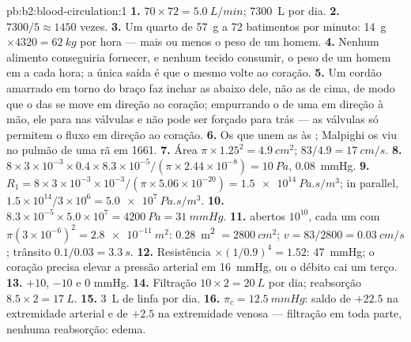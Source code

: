 \begin{solution}{pb:b2:blood-circulation:1}
\textbf{1.} $70\times 72 = \qty{5.0}{L/min}$; \qty{7300}{L} por dia.
\textbf{2.} $7300/5 \approx 1450$ vezes.
\textbf{3.} Um quarto de \qty{57}{g} a 72 batimentos por minuto:
\qty{14}{g} $\times 4320 = \qty{62}{kg}$ por hora --- mais ou menos o
peso de um homem.
\textbf{4.} Nenhum alimento conseguiria fornecer, e nenhum tecido
consumir, o peso de um homem em  a cada hora; a única saída é que
o mesmo  volte ao coração.
\textbf{5.} Um cordão amarrado em torno do braço faz inchar as 
abaixo dele, não as de cima, de modo que o  das  se move em
direção ao coração; empurrando o  de uma  em direção à mão,
ele para nas válvulas e não pode ser forçado para trás --- as válvulas
só permitem o fluxo em direção ao coração.
\textbf{6.} Os  que unem as  às ; Malpighi os viu
no pulmão de uma rã em 1661.
\textbf{7.} Área $\pi\times 1.25^{2} = \qty{4.9}{cm^2}$; $83/4.9 =
\qty{17}{cm/s}$.
\textbf{8.} $8\times 3\times 10^{-3}\times 0.4\times 8.3\times
10^{-5}/(\pi\times 2.44\times 10^{-8}) = \qty{10}{Pa}$, \qty{0.08}{mmHg}.
\textbf{9.} $R_{1} = 8\times 3\times 10^{-3}\times 10^{-3}/(\pi\times
5.06\times 10^{-20}) = \qty{1.5e14}{Pa.s/m^3}$; in parallel,
$1.5\times 10^{14}/3\times 10^{6} = \qty{5.0e7}{Pa.s/m^3}$.
\textbf{10.} $8.3\times 10^{-5}\times 5.0\times 10^{7} = \qty{4200}{Pa}
= \qty{31}{mmHg}$.
\textbf{11.}  abertos $10^{10}$, cada um com
$\pi(3\times 10^{-6})^{2}
= \qty{2.8e-11}{m^2}$: \qty{0.28}{m^2} $= \qty{2800}{cm^2}$; $v =
83/2800 = \qty{0.03}{cm/s}$; trânsito $0.1/0.03 = \qty{3.3}{s}$.
\textbf{12.} Resistência $\times(1/0.9)^{4} = 1.52$: \qty{47}{mmHg}; o
coração precisa elevar a pressão arterial em \qty{16}{mmHg}, ou o
débito cai um terço.
\textbf{13.} $+10$, $-10$ e $0$ mmHg.
\textbf{14.} Filtração $10\times 2 = \qty{20}{L}$ por dia; reabsorção
$8.5\times 2 = \qty{17}{L}$.
\textbf{15.} \qty{3}{L} de linfa por dia.
\textbf{16.} $\pi_c = \qty{12.5}{mmHg}$: saldo de $+22.5$ na
extremidade arterial e de $+2.5$ na extremidade venosa --- filtração em
toda parte, nenhuma reabsorção: edema.

\end{solution}

